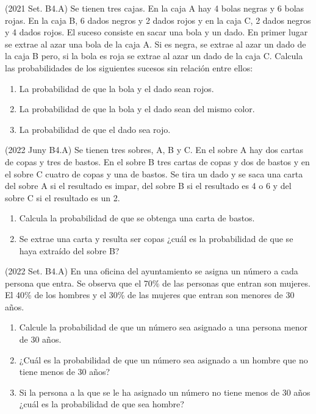 \item (2021 Set. B4.A) Se tienen tres cajas. En la caja A hay 4 bolas negras y 6 bolas rojas. En la caja B, 6 dados negros y 2 dados rojos y en la caja C, 2 dados negros y 4 dados rojos. El suceso consiste en sacar una bola y un dado. En primer lugar se extrae al azar una bola de la caja A. Si es negra, se
extrae al azar un dado de la caja B pero, si la bola es roja se extrae al azar un dado de la caja C.
Calcula las probabilidades de los siguientes sucesos sin relación entre ellos:
\begin{enumerate}
 \item La probabilidad de que la bola y el dado sean rojos.
 \item La probabilidad de que la bola y el dado sean del mismo color.
 \item La probabilidad de que el dado sea rojo.
\end{enumerate}


\item (2022 Juny B4.A) Se tienen tres sobres, A, B y C. En el sobre A hay dos cartas de copas y tres
de bastos. En el sobre B tres cartas de copas y dos de bastos y en el sobre C cuatro de copas y una de bastos. Se tira un dado y se saca una carta del sobre A si el resultado es impar, del sobre B si el resultado es 4 o 6 y del sobre C si el resultado es un 2.
\begin{enumerate}
 \item Calcula la probabilidad de que se obtenga una carta de bastos.
 \item Se extrae una carta y resulta ser copas ¿cuál es la probabilidad de que se haya extraído del sobre B?
\end{enumerate}


\item (2022 Set. B4.A) En una oficina del ayuntamiento se asigna un número a cada persona que
entra. Se observa que el 70\% de las personas que entran son mujeres. El 40\% de los
hombres y el 30\% de las mujeres que entran son menores de 30 años.
\begin{enumerate}
 \item Calcule la probabilidad de que un número sea asignado a una persona menor de 30 años.
 \item ¿Cuál es la probabilidad de que un número sea asignado a un hombre que no tiene menos de 30 años?
 \item Si la persona a la que se le ha asignado un número no tiene menos de 30 años ¿cuál es la probabilidad de que sea hombre?
\end{enumerate}

